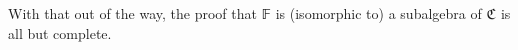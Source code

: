 \ccpad
With that out of the way, the proof that \af 𝔽 is (isomorphic to) a subalgebra of \af ℭ is all but complete.
\ccpad
\begin{code}%
\>[1]\AgdaSpace{}%
\AgdaSymbol{:}\AgdaSpace{}%
\AgdaSpace{}%
\AgdaSpace{}%
\AgdaSpace{}%
\AgdaSpace{}%
\AgdaSpace{}%
\AgdaSpace{}%
\AgdaSpace{}%
\<%
\\
%
\>[1]\AgdaSpace{}%
\AgdaSpace{}%
\AgdaSymbol{=}\AgdaSpace{}%
\AgdaSpace{}%
\AgdaSpace{}%
\AgdaSpace{}%
\AgdaOperator{\AgdaInductiveConstructor{,}}\AgdaSpace{}%
\AgdaSymbol{(}\AgdaSpace{}%
\AgdaOperator{\AgdaInductiveConstructor{,}}\AgdaSpace{}%
\AgdaSpace{}%
\AgdaSpace{}%
\AgdaSymbol{)}\<%
\\
\>[1][@{}l@{\AgdaIndent{0}}]%
\>[2]\<%
\\
\>[2][@{}l@{\AgdaIndent{0}}]%
\>[3]\AgdaSpace{}%
\AgdaSymbol{:}\AgdaSpace{}%
\AgdaSpace{}%
\AgdaSpace{}%
\AgdaSpace{}%
\<%
\\
%
\>[3]\AgdaSpace{}%
\AgdaSymbol{=}\AgdaSpace{}%
\AgdaSpace{}%
\AgdaSpace{}%
\AgdaSpace{}%
\AgdaSpace{}%
\AgdaSpace{}%
\<%
\end{code}

